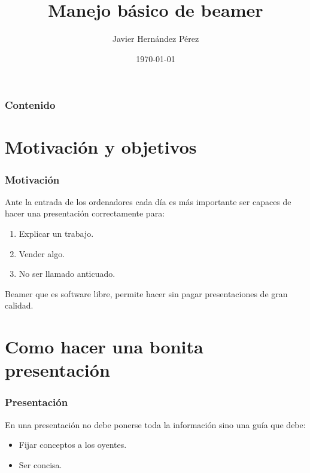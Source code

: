 \documentclass{beamer}
\title{Manejo básico de beamer}
\author{Javier Hernández Pérez}
\date{\today}
\begin{document}
\begin{frame}
\titlepage
\end{frame}

\begin{frame}
  \frametitle{Contenido}
  \tableofcontents
\end{frame} 
\section{Motivación y objetivos}
\begin{frame}
\frametitle{Motivación}
Ante la entrada de los ordenadores cada día es más importante ser capaces de hacer una presentación correctamente para:
\pause
\begin{enumerate}[<+->]
\item Explicar un trabajo.
\pause
\item Vender algo.
\pause
\item No ser llamado anticuado.
\pause
\end{enumerate}
Beamer que es software libre, permite hacer sin pagar presentaciones de gran calidad.
\end{frame}
\section{Como hacer una bonita presentación}

\begin{frame}
  \frametitle{Presentación} 

    En una presentación no debe ponerse toda la información sino una guía que debe:
    \pause

    \begin{itemize}
    \item
    Fijar conceptos a los oyentes.
    \pause

    \item
    Ser concisa.

  \end{itemize}

\end{frame}
\end{document}
